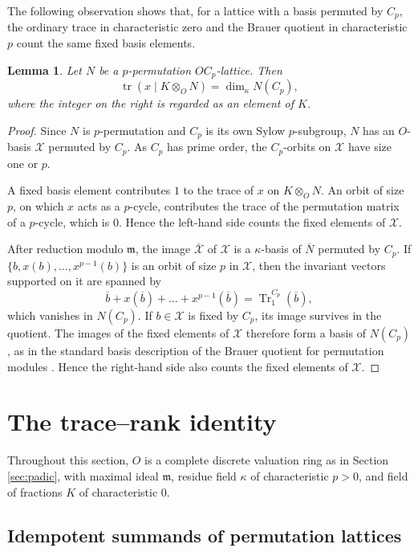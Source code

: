 \documentclass[11pt]{article}
\theoremstyle{plain}
\newtheorem{lemma}[theorem]{Lemma}
\theoremstyle{remark}
\newcommand{\tr}{\operatorname{tr}}
\newcommand{\Tr}{\operatorname{Tr}}
\begin{document}
The following observation shows that, for a lattice with a basis permuted by $C_p$,
the ordinary trace in characteristic zero and the Brauer quotient in characteristic $p$ count the same fixed basis elements.

\begin{lemma}\label{lem:trace-brauer}
Let $N$ be a $p$-permutation $OC_p$-lattice.  Then
\[
 \tr\left(x\mid K\otimes_{O}N\right)=\dim_{\kappa}N(C_p),
\]
where the integer on the right is regarded as an element of $K$.
\end{lemma}

\begin{proof}
Since $N$ is $p$-permutation and $C_p$ is its own Sylow $p$-subgroup, $N$ has an $O$-basis $\mathcal X$ permuted by $C_p$.
As $C_p$ has prime order, the $C_p$-orbits on $\mathcal X$ have size one or $p$.

A fixed basis element contributes $1$ to the trace of $x$ on $K\otimes_{O}N$.
An orbit of size $p$, on which $x$ acts as a $p$-cycle, contributes the trace of the permutation matrix of a $p$-cycle,
which is $0$.
Hence the left-hand side counts the fixed elements of $\mathcal X$.

After reduction modulo $\mathfrak m$,
the image $\overline{\mathcal X}$ of $\mathcal X$ is a $\kappa$-basis of $\overline N$ permuted by $C_p$.
If $\{b,x(b),\dots,x^{p-1}(b)\}$ is an orbit of size $p$ in $\mathcal X$,
then the invariant vectors supported on it are spanned by
\[
 \overline b+x(\overline b)+\dots+x^{p-1}(\overline b)=\Tr_1^{C_p}(\overline b),
\]
which vanishes in $N(C_p)$.
If $b\in\mathcal X$ is fixed by $C_p$, its image survives in the quotient.
The images of the fixed elements of $\mathcal X$ therefore form a basis of $N(C_p)$,
as in the standard basis description of the Brauer quotient for permutation modules \cite[Proposition 2.5(4)]{BoucThevenaz}.
Hence the right-hand side also counts the fixed elements of $\mathcal X$.
\end{proof}

\section{The trace--rank identity}\label{sec:general}

Throughout this section, $O$ is a complete discrete valuation ring as in Section \ref{sec:padic},
with maximal ideal $\mathfrak m$, residue field $\kappa$ of characteristic $p>0$,
and field of fractions $K$ of characteristic $0$.

\subsection{Idempotent summands of permutation lattices}
\end{document}
